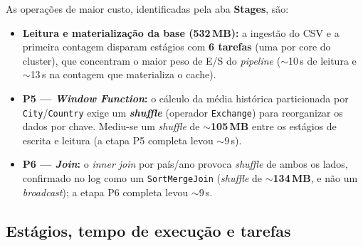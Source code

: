 As operações de maior custo, identificadas pela aba \textbf{Stages}, são:
\begin{itemize}
  \item \textbf{Leitura e materialização da base (532\,MB):} a ingestão do CSV e a
        primeira contagem disparam estágios com \textbf{6 tarefas} (uma por core do
        cluster), que concentram o maior peso de E/S do \textit{pipeline}
        ($\sim$10\,s de leitura e $\sim$13\,s na contagem que materializa o cache).
  \item \textbf{P5 --- \textit{Window Function}:} o cálculo da média histórica
        particionada por \texttt{City}/\texttt{Country} exige um \textbf{\textit{shuffle}}
        (operador \texttt{Exchange}) para reorganizar os dados por chave. Mediu-se um
        \textit{shuffle} de $\sim$\textbf{105\,MB} entre os estágios de escrita e leitura
        (a etapa P5 completa levou $\sim$9\,s).
  \item \textbf{P6 --- \textit{Join}:} o \textit{inner join} por país/ano provoca
        \textit{shuffle} de ambos os lados, confirmado no log como um
        \texttt{SortMergeJoin} (\textit{shuffle} de $\sim$\textbf{134\,MB}, e não um
        \textit{broadcast}); a etapa P6 completa levou $\sim$9\,s.
\end{itemize}

\subsection{Estágios, tempo de execução e tarefas}

